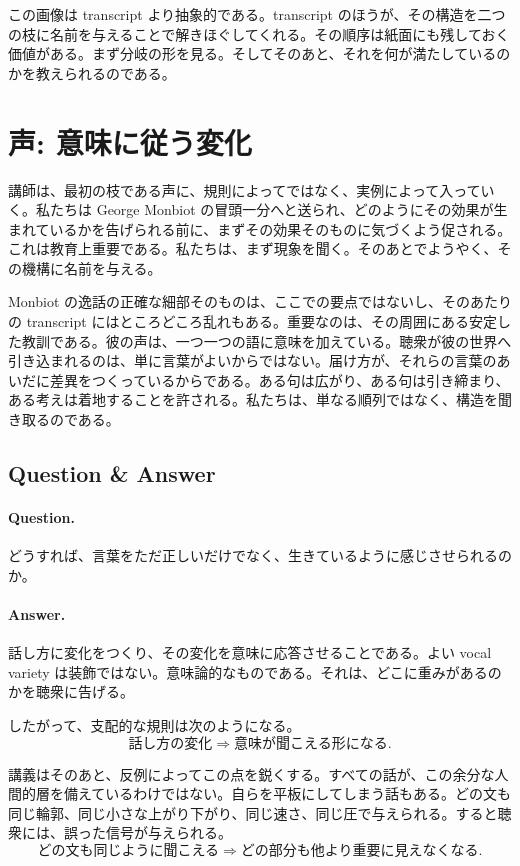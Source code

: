 この画像は transcript より抽象的である。transcript のほうが、その構造を二つの枝に名前を与えることで解きほぐしてくれる。その順序は紙面にも残しておく価値がある。まず分岐の形を見る。そしてそのあと、それを何が満たしているのかを教えられるのである。

\section{声: 意味に従う変化}

講師は、最初の枝である声に、規則によってではなく、実例によって入っていく。私たちは George Monbiot の冒頭一分へと送られ、どのようにその効果が生まれているかを告げられる前に、まずその効果そのものに気づくよう促される。これは教育上重要である。私たちは、まず現象を聞く。そのあとでようやく、その機構に名前を与える。

Monbiot の逸話の正確な細部そのものは、ここでの要点ではないし、そのあたりの transcript にはところどころ乱れもある。重要なのは、その周囲にある安定した教訓である。彼の声は、一つ一つの語に意味を加えている。聴衆が彼の世界へ引き込まれるのは、単に言葉がよいからではない。届け方が、それらの言葉のあいだに差異をつくっているからである。ある句は広がり、ある句は引き締まり、ある考えは着地することを許される。私たちは、単なる順列ではなく、構造を聞き取るのである。

\subsection{Question \& Answer}

\paragraph{Question.} どうすれば、言葉をただ正しいだけでなく、生きているように感じさせられるのか。

\paragraph{Answer.} 話し方に変化をつくり、その変化を意味に応答させることである。よい vocal variety は装飾ではない。意味論的なものである。それは、どこに重みがあるのかを聴衆に告げる。

したがって、支配的な規則は次のようになる。
\begin{equation}
\text{話し方の変化} \Longrightarrow \text{意味が聞こえる形になる}.
\end{equation}

講義はそのあと、反例によってこの点を鋭くする。すべての話が、この余分な人間的層を備えているわけではない。自らを平板にしてしまう話もある。どの文も同じ輪郭、同じ小さな上がり下がり、同じ速さ、同じ圧で与えられる。すると聴衆には、誤った信号が与えられる。
\begin{equation}
\text{どの文も同じように聞こえる} \Longrightarrow \text{どの部分も他より重要に見えなくなる}.
\end{equation}

